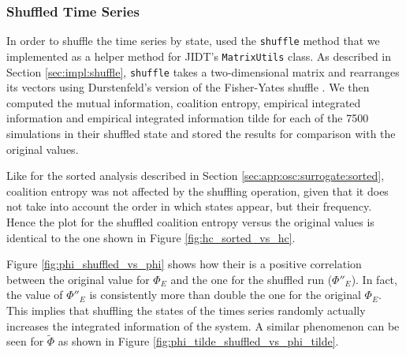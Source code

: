 \documentclass[a4paper,11pt]{article}
\begin{document}
\subsubsection{Shuffled Time Series}
\label{sec:app:osc:surrogate:shuffled}

In order to shuffle the time series by state, used the \texttt{shuffle} method that we implemented as a helper method for JIDT's \texttt{MatrixUtils} class. As described in Section \ref{sec:impl:shuffle}, \texttt{shuffle} takes a two-dimensional matrix and rearranges its vectors using Durstenfeld's version of the Fisher-Yates shuffle \cite{Durstenfeld1964}. We then computed the mutual information, coalition entropy, empirical integrated information and empirical integrated information tilde for each of the 7500 simulations in their shuffled state and stored the results for comparison with the original values.

Like for the sorted analysis described in Section \ref{sec:app:osc:surrogate:sorted}, coalition entropy was not affected by the shuffling operation, given that it does not take into account the order in which states appear, but their frequency. Hence the plot for the shuffled coalition entropy versus the original values is identical to the one shown in Figure \ref{fig:hc_sorted_vs_hc}.

Figure \ref{fig:phi_shuffled_vs_phi} shows how their is a positive correlation between the original value for $\Phi_E$ and the one for the shuffled run ($\Phi''_E$). In fact, the value of $\Phi''_E$ is consistently more than double the one for the original $\Phi_E$. This implies that shuffling the states of the times series randomly actually increases the integrated information of the system. A similar phenomenon can be seen for $\widetilde{\Phi}$ as shown in Figure \ref{fig:phi_tilde_shuffled_vs_phi_tilde}. 
\end{document}
